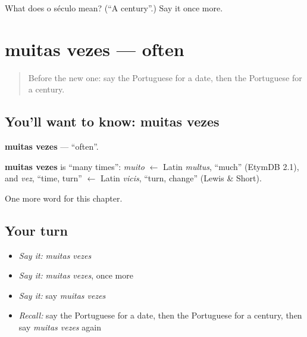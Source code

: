 \begin{tcolorbox}[breakable,colback=teal!4,colframe=teal!35!black,title={Before you move on}]
What does o século mean? (\textquotedblleft{}A century\textquotedblright{}.) Say it once more.
\end{tcolorbox}
\section[muitas vezes]{muitas vezes — often}

\label{lesson:PT-C129-muitas-vezes}



\begin{quote}
Before the new one: say the Portuguese for a date, then the Portuguese for a century.
\end{quote}

\subsection*{You'll want to know: muitas vezes}
\textbf{muitas vezes} — \textquotedblleft{}often\textquotedblright{}.

\begin{cousinweb}
\textbf{muitas vezes} is \textquotedblleft{}many times\textquotedblright{}: \emph{muito} $\leftarrow$ Latin \emph{multus}, \textquotedblleft{}much\textquotedblright{} (EtymDB 2.1), and \emph{vez}, \textquotedblleft{}time, turn\textquotedblright{} $\leftarrow$ Latin \emph{vicis}, \textquotedblleft{}turn, change\textquotedblright{} (Lewis \& Short).
\end{cousinweb}

\begin{grammarlens}[title={What you've built}]
One more word for this chapter.
\end{grammarlens}

\subsection*{Your turn}
\begin{itemize}
\raggedright
  \item \emph{Say it:} \emph{muitas vezes}
  \item \emph{Say it:} \emph{muitas vezes}, once more
  \item \emph{Say it:} say \emph{muitas vezes}
  \item \emph{Recall:} say the Portuguese for a date, then the Portuguese for a century, then say \emph{muitas vezes} again
\end{itemize}


